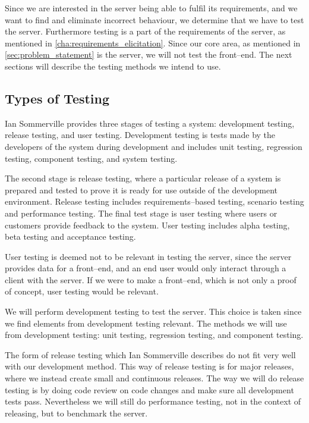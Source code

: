 Since we are interested in the server being able to fulfil its requirements, 
and we want to find and eliminate incorrect behaviour, we determine that we have to test the server.
Furthermore testing is a part of the requirements of the server, as mentioned in \cref{cha:requirements_elicitation}.
Since our core area, as mentioned in \cref{sec:problem_statement} is the server, we will not test the front--end. 
The next sections will describe the testing methods we intend to use.

\subsection{Types of Testing}
Ian Sommerville provides three stages of testing a system\cite[p.~231]{software_engineering}:
development testing, release testing, and user testing.
Development testing is tests made by the developers of the system during development 
and includes unit testing, regression testing, component testing, 
and system testing\cite[p.~232]{software_engineering}.

The second stage is release testing, 
where a particular release of a system is prepared and tested to prove it is ready for use outside of the development environment\cite[p.~245]{software_engineering}.
Release testing includes requirements--based testing, scenario testing and performance testing.
The final test stage is user testing where users or customers provide feedback to the system.\cite[p.~249]{software_engineering}
User testing includes alpha testing, beta testing and acceptance testing.

User testing is deemed not to be relevant in testing the server, 
since the server provides data for a front--end,
and an end user would only interact through a client with the server.
If we were to make a front--end, which is not only a proof of concept, user testing would be relevant.

We will perform development testing to test the server.
This choice is taken since we find elements from development testing relevant.
The methods we will use from development testing:
unit testing, regression testing, and component testing.

The form of release testing which Ian Sommerville describes do not fit very well with our development method.
This way of release testing is for major releases, where we instead create small and continuous releases.
The way we will do release testing is by doing code review on code changes and make sure all development tests pass.
Nevertheless we will still do performance testing, not in the context of releasing, but to benchmark the server.

